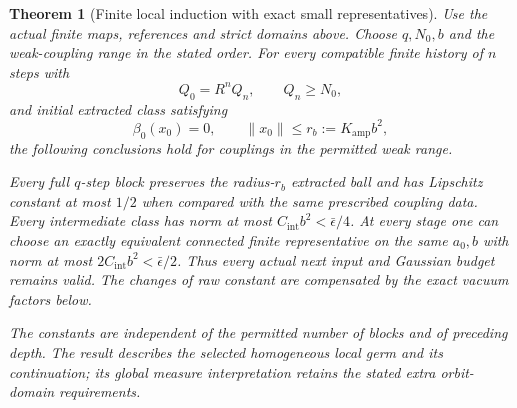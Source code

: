 \documentclass[11pt]{article}
\newtheorem{theorem}{Theorem}[section]
\theoremstyle{remark}
\begin{document}
\begin{theorem}[Finite local induction with exact small representatives]
\label{fqi-theorem}
Use the actual finite maps, references and strict domains above.
Choose $q,N_0,b$ and the weak-coupling range in the stated order.
For every compatible finite history of $n$ steps with
\begin{equation}
 Q_0=R^nQ_n,\qquad Q_n\ge N_0,
 \label{fqi-history-periods}
\end{equation}
and initial extracted class satisfying
\begin{equation}
 \beta_0(x_0)=0,\qquad
 \|x_0\|\le r_b:=K_{\mathrm{amp}}b^2,
 \label{fqi-initial-ball}
\end{equation}
the following conclusions hold for couplings in the permitted
weak range.

Every full $q$-step block preserves the radius-$r_b$ extracted
ball and has Lipschitz constant at most $1/2$ when compared
with the same prescribed coupling data. Every intermediate
class has norm at most $C_{\mathrm{int}}b^2<\bar\epsilon/4$.
At every stage one can choose an exactly equivalent connected
finite representative on the same $a_0,b$ with norm at most
$2C_{\mathrm{int}}b^2<\bar\epsilon/2$. Thus every actual next
input and Gaussian budget remains valid. The changes of raw
constant are compensated by the exact vacuum factors below.

The constants are independent of the permitted number of
blocks and of preceding depth. The result describes the
selected homogeneous local germ and its continuation; its
global measure interpretation retains the stated extra
orbit-domain requirements.
\end{theorem}
\end{document}
